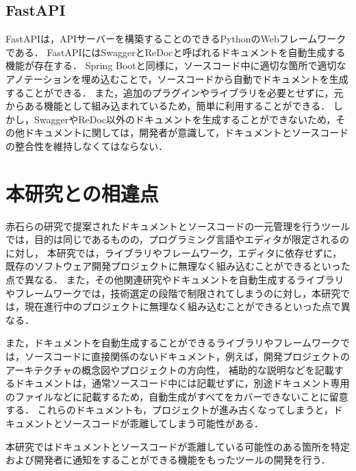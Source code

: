 \subsection{FastAPI}
FastAPI\cite{fastapi}は，APIサーバーを構築することのできるPythonのWebフレームワークである．
FastAPIにはSwaggerとReDoc\cite{redoc}と呼ばれるドキュメントを自動生成する機能が存在する．
Spring Bootと同様に，ソースコード中に適切な箇所で適切なアノテーションを埋め込むことで，ソースコードから自動でドキュメントを生成することができる．
また，追加のプラグインやライブラリを必要とせずに，元からある機能として組み込まれているため，簡単に利用することができる．
しかし，SwaggerやReDoc以外のドキュメントを生成することができないため，その他ドキュメントに関しては，開発者が意識して，ドキュメントとソースコードの整合性を維持しなくてはならない．

\section{本研究との相違点}
赤石らの研究で提案されたドキュメントとソースコードの一元管理を行うツールでは，目的は同じであるものの，プログラミング言語やエディタが限定されるのに対し，
本研究では，ライブラリやフレームワーク，エディタに依存せずに，既存のソフトウェア開発プロジェクトに無理なく組み込むことができるといった点で異なる．
また，その他関連研究やドキュメントを自動生成するライブラリやフレームワークでは，技術選定の段階で制限されてしまうのに対し，本研究では，現在進行中のプロジェクトに無理なく組み込むことができるといった点で異なる．

また，ドキュメントを自動生成することができるライブラリやフレームワークでは，ソースコードに直接関係のないドキュメント，例えば，開発プロジェクトのアーキテクチャの概念図やプロジェクトの方向性，
補助的な説明などを記載するドキュメントは，通常ソースコード中には記載せずに，別途ドキュメント専用のファイルなどに記載するため，自動生成がすべてをカバーできないことに留意する．
これらのドキュメントも，プロジェクトが進み古くなってしまうと，ドキュメントとソースコードが乖離してしまう可能性がある．

本研究ではドキュメントとソースコードが乖離している可能性のある箇所を特定および開発者に通知をすることができる機能をもったツールの開発を行う．
